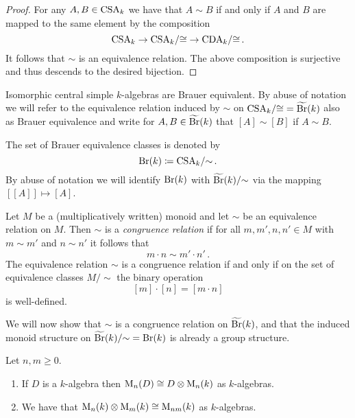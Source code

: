 \begin{proof}
  For any $A, B \in \operatorname{CSA}_k$ we have that $A \sim B$ if and only if $A$ and $B$ are mapped to the same element by the composition
  \[
        \operatorname{CSA}_k
    \to \operatorname{CSA}_k\!/{\cong}
    \to \operatorname{CDA}_k\!/{\cong} \,.
  \]
  It follows that $\sim$ is an equivalence relation.
  The above composition is surjective and thus descends to the desired bijection.
\end{proof}


\begin{remark}
  Isomorphic central simple $k$-algebras are Brauer equivalent.
  By abuse of notation we will refer to the equivalence relation induced by $\sim$ on $\operatorname{CSA}_k\!/{\cong} = \widetilde{\operatorname{Br}}(k)$ also as Brauer equivalence and write for $A, B \in \widetilde{\operatorname{Br}}(k)$ that $[A] \sim [B]$ if $A \sim B$.
\end{remark}


\begin{notation}
  The set of Brauer equivalence classes is denoted by
  \[
              \operatorname{Br}(k)
    \coloneqq  \operatorname{CSA}_k\!/{\sim} \,.
  \]
  By abuse of notation we will identify $\operatorname{Br}(k)$ with $\widetilde{\operatorname{Br}}(k)/{\sim}$ via the mapping $[[A]] \mapsto [A]$.
\end{notation}


\begin{recall}
  Let $M$ be a (multiplicatively written) monoid and let $\sim$ be an equivalence relation on $M$.
  Then $\sim$ is a \emph{congruence relation} if for all $m, m', n, n' \in M$ with $m \sim m'$ and $n \sim n'$ it follows that
  \[
    m \cdot n \sim m' \cdot n' \,.
  \]
  The equivalence relation $\sim$ is a congruence relation if and only if on the set of equivalence classes $M/{\sim}$ the binary operation
  \[
      [m] \cdot [n]
    = [m \cdot n]
  \]
  is well-defined.
\end{recall}


\begin{fluff}
  We will now show that $\sim$ is a congruence relation on $\widetilde{\operatorname{Br}}(k)$, and that the induced monoid structure on $\widetilde{\operatorname{Br}}(k)/{\sim} = \operatorname{Br}(k)$ is already a group structure.
\end{fluff}


\begin{lemma}
  Let $n, m \geq 0$.
  \begin{enumerate}
    \item
      If $D$ is a $k$-algebra then $\operatorname{M}_n(D) \cong D \mathbin{\otimes} \operatorname{M}_n(k)$ as $k$-algebras.
    \item
      We have that $\operatorname{M}_n(k) \mathbin{\otimes} \operatorname{M}_m(k) \cong \operatorname{M}_{nm}(k)$ as $k$-algebras.
  \end{enumerate}
\end{lemma}


